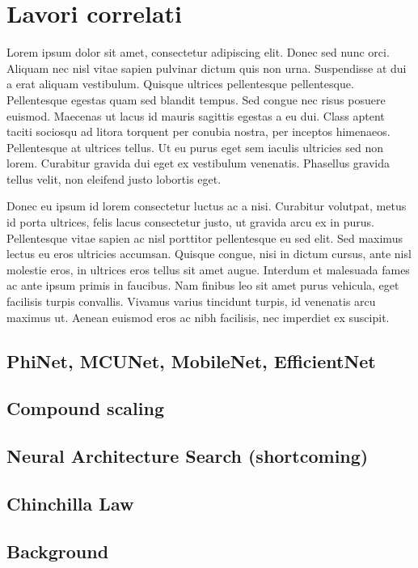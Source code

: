 \chapter{Lavori correlati}
\label{cha:intro}

Lorem ipsum dolor sit amet, consectetur adipiscing elit. Donec sed nunc orci. Aliquam nec nisl vitae sapien pulvinar dictum quis non urna. Suspendisse at dui a erat aliquam vestibulum. Quisque ultrices pellentesque pellentesque. Pellentesque egestas quam sed blandit tempus. Sed congue nec risus posuere euismod. Maecenas ut lacus id mauris sagittis egestas a eu dui. Class aptent taciti sociosqu ad litora torquent per conubia nostra, per inceptos himenaeos. Pellentesque at ultrices tellus. Ut eu purus eget sem iaculis ultricies sed non lorem. Curabitur gravida dui eget ex vestibulum venenatis. Phasellus gravida tellus velit, non eleifend justo lobortis eget. 
\cite{coulouris}

Donec eu ipsum id lorem consectetur luctus ac a nisi. Curabitur volutpat, metus id porta ultrices, felis lacus consectetur justo, ut gravida arcu ex in purus. Pellentesque vitae sapien ac nisl porttitor pellentesque eu sed elit. Sed maximus lectus eu eros ultricies accumsan. Quisque congue, nisi in dictum cursus, ante nisl molestie eros, in ultrices eros tellus sit amet augue. Interdum et malesuada fames ac ante ipsum primis in faucibus. Nam finibus leo sit amet purus vehicula, eget facilisis turpis convallis. Vivamus varius tincidunt turpis, id venenatis arcu maximus ut. Aenean euismod eros ac nibh facilisis, nec imperdiet ex suscipit.
\cite{dalal}

\section{PhiNet, MCUNet, MobileNet, EfficientNet}
\section{Compound scaling}
\section{Neural Architecture Search (shortcoming)}
\section{Chinchilla Law}
\section{Background}
\label{sec:context}

